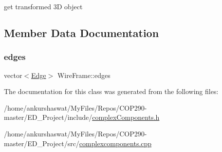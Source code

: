 get transformed 3D object 

\subsection{Member Data Documentation}
\mbox{\label{classWireFrame_a95f1653c5b972aa8514d34c0b7633d75}} 
\subsubsection{\texorpdfstring{edges}{edges}}
{\footnotesize\ttfamily vector$<$\hyperlink{structEdge}{Edge}$>$ Wire\+Frame\+::edges}



The documentation for this class was generated from the following files\+:\begin{DoxyCompactItemize}
\item 
/home/ankurshaswat/\+My\+Files/\+Repos/\+C\+O\+P290-\/master/\+E\+D\+\_\+\+Project/include/\hyperlink{complexComponents_8h}{complex\+Components.\+h}\item 
/home/ankurshaswat/\+My\+Files/\+Repos/\+C\+O\+P290-\/master/\+E\+D\+\_\+\+Project/src/\hyperlink{complexcomponents_8cpp}{complexcomponents.\+cpp}\end{DoxyCompactItemize}

